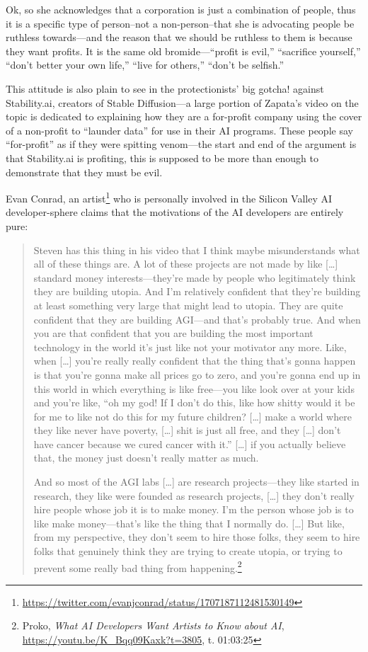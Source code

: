 \documentclass[11pt]{article}
\begin{document}
Ok, so she acknowledges that a corporation is just a combination of people, thus it is a specific type of person--not a non-person--that she is advocating people be ruthless towards---and the reason that we should be ruthless to them is because they want profits. It is the same old bromide---``profit is evil,'' ``sacrifice yourself,'' ``don't better your own life,'' ``live for others,'' ``don't be selfish.''

This attitude is also plain to see in the protectionists' big gotcha! against Stability.ai, creators of Stable Diffusion---a large portion of Zapata's video on the topic is dedicated to explaining how they are a for-profit company using the cover of a non-profit to ``launder data'' for use in their AI programs. These people say ``for-profit'' as if they were spitting venom---the start and end of the argument is that Stability.ai is profiting, this is supposed to be more than enough to demonstrate that they must be evil.

Evan Conrad, an artist\footnote{\url{https://twitter.com/evanjconrad/status/1707187112481530149}} who is personally involved in the Silicon Valley AI developer-sphere claims that the motivations of the AI developers are entirely pure:
\begin{quote}
Steven has this thing in his video that I think maybe misunderstands what all of these things are. A lot of these projects are not made by like [\ldots{}] standard money interests---they're made by people who legitimately think they are building utopia. And I'm relatively confident that they're building at least something very large that might lead to utopia. They are quite confident that they are building AGI---and that's probably true. And when you are that confident that you are building the most important technology in the world it's just like not your motivator any more. Like, when [\ldots{}] you're really really confident that the thing that's gonna happen is that you're gonna make all prices go to zero, and you're gonna end up in this world in which everything is like free---you like look over at your kids and you're like, ``oh my god! If I don't do this, like how shitty would it be for me to like not do this for my future children? [\ldots{}] make a world where they like never have poverty, [\ldots{}] shit is just all free, and they [\ldots{}] don't have cancer because we cured cancer with it.'' [\ldots{}] if you actually believe that, the money just doesn't really matter as much.

And so most of the AGI labs [\ldots{}] are research projects---they like started in research, they like were founded as research projects, [\ldots{}] they don't really hire people whose job it is to make money. I'm the person whose job is to like make money---that's like the thing that I normally do. [\ldots{}] But like, from my perspective, they don't seem to hire those folks, they seem to hire folks that genuinely think they are trying to create utopia, or trying to prevent some really bad thing from happening.\footnote{Proko, \emph{What AI Developers Want Artists to Know about AI}, \url{https://youtu.be/K\_Bqq09Kaxk?t=3805}, t. 01:03:25}
\end{quote}
\end{document}
